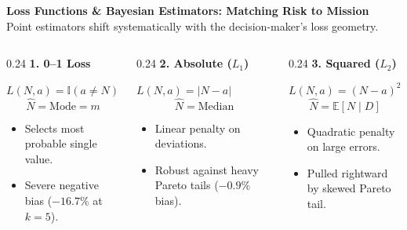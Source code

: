 \documentclass[aspectratio=169,10pt]{beamer}
\begin{document}
\begin{frame}[c]
  \begin{center}
    {\large \textbf{\color{headernavy} Loss Functions \& Bayesian Estimators: Matching Risk to Mission}}\\[0.10cm]
    {\scriptsize \color{subgray} Point estimators shift systematically with the decision-maker's loss geometry.}
  \end{center}
  \vspace{0.32cm}
  
  \begin{columns}[t,onlytextwidth]
    \begin{column}{0.24\textwidth}
      {\small \textbf{\color{accentred} 1. 0--1 Loss}}\\[0.04cm]
      {\scriptsize $L(N,a) = \mathbb{I}(a \ne N)$
      \begin{equation*}
        \widehat{N} = \mathrm{Mode} = m
      \end{equation*}
      \begin{itemize}
        \setlength{\itemsep}{0.04cm}
        \item Selects most probable single value.
        \item Severe negative bias ($-16.7\%$ at $k=5$).
      \end{itemize}}
    \end{column}
    
    \begin{column}{0.24\textwidth}
      {\small \textbf{\color{accentgreen} 2. Absolute ($L_1$)}}\\[0.04cm]
      {\scriptsize $L(N,a) = |N - a|$
      \begin{equation*}
        \widehat{N} = \mathrm{Median}
      \end{equation*}
      \begin{itemize}
        \setlength{\itemsep}{0.04cm}
        \item Linear penalty on deviations.
        \item Robust against heavy Pareto tails ($-0.9\%$ bias).
      \end{itemize}}
    \end{column}
    
    \begin{column}{0.24\textwidth}
      {\small \textbf{\color{accentblue} 3. Squared ($L_2$)}}\\[0.04cm]
      {\scriptsize $L(N,a) = (N - a)^2$
      \begin{equation*}
        \widehat{N} = \mathbb{E}[N \mid D]
      \end{equation*}
      \begin{itemize}
        \setlength{\itemsep}{0.04cm}
        \item Quadratic penalty on large errors.
        \item Pulled rightward by skewed Pareto tail.
      \end{itemize}}
    \end{column}
    

\end{columns}
\end{frame}
\end{document}
